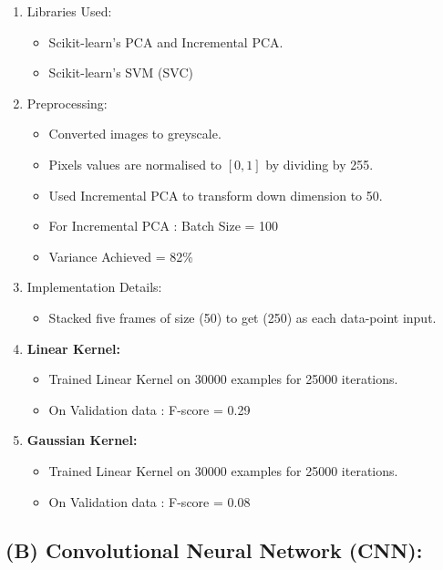 \documentclass[a4 paper]{article}
\begin{document}
\begin{enumerate}
    \item Libraries Used:
    \begin{itemize}
        \item Scikit-learn's PCA and Incremental PCA.
        \item Scikit-learn's SVM (SVC)
    \end{itemize}
    \item Preprocessing:
    \begin{itemize}
        \item Converted images to greyscale.
        \item Pixels values are normalised to $[0,1]$ by dividing by 255.
        \item Used Incremental PCA to transform down dimension to 50.
        \item For Incremental PCA : Batch Size = 100
        \item Variance Achieved = 82\%
    \end{itemize}
    
    \item Implementation Details:
    \begin{itemize}
        \item Stacked five frames of size (50) to get (250) as each data-point input.
    \end{itemize}

    \item \textbf{Linear Kernel:}
    \begin{itemize}
        \item Trained Linear Kernel on 30000 examples for 25000 iterations.
        \item On Validation data : F-score = 0.29
    \end{itemize}

    \item \textbf{Gaussian Kernel:}
    \begin{itemize}
        \item Trained Linear Kernel on 30000 examples for 25000 iterations.
        \item On Validation data : F-score = 0.08
    \end{itemize}

\end{enumerate}

\subsection*{(B) Convolutional Neural Network (CNN):}
\end{document}
